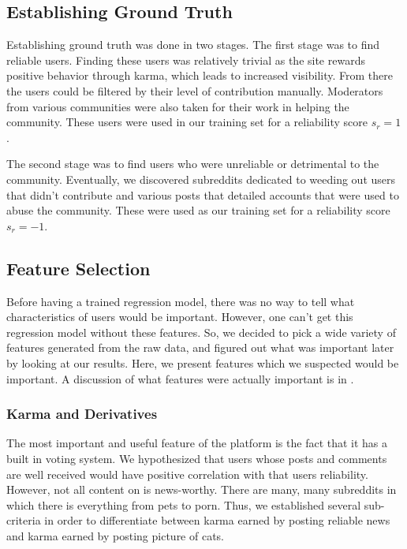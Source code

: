 
\subsection{Establishing Ground Truth} %
\label{sub:establishing_ground_truth}
Establishing ground truth was done in two stages. The first stage was to find
reliable users. Finding these users was relatively trivial as the site rewards
positive behavior through karma, which leads to increased visibility. From there
the users could be filtered by their level of contribution manually. Moderators
from various communities were also taken for their work in helping the
community.  These users were used in our training set for a reliability score
$s_r = 1$.

The second stage was to find users who were unreliable or detrimental to the
community. Eventually, we discovered subreddits dedicated to weeding out users
that didn't contribute and various posts that detailed accounts that were used
to abuse the community. These were used as our training set for a reliability
score $s_r = -1$.


\subsection{Feature Selection} %
\label{sub:feature_selection}

Before having a trained regression model, there was no way to tell what
characteristics of \reddit{} users would be important. However, one can't get
this regression model without these features. So, we decided to pick a wide
variety of features generated from the raw data, and figured out what was
important later by looking at our results. Here, we present features which we
suspected would be important. A discussion of what features were actually
important is in .

\subsubsection{\reddit{} Karma and Derivatives} %
\label{ssub:reddit_karma_and_derivatives}

The most important and useful feature of the \reddit{} platform is the fact that
it has a built in voting system. We hypothesized that users whose posts and
comments are well received would have positive correlation with that users
reliability. However, not all content on \reddit{} is news-worthy. There are
many, many subreddits in which there is everything from pets to porn. Thus, we
established several sub-criteria in order to differentiate between karma earned
by posting reliable news and karma earned by posting picture of cats.

